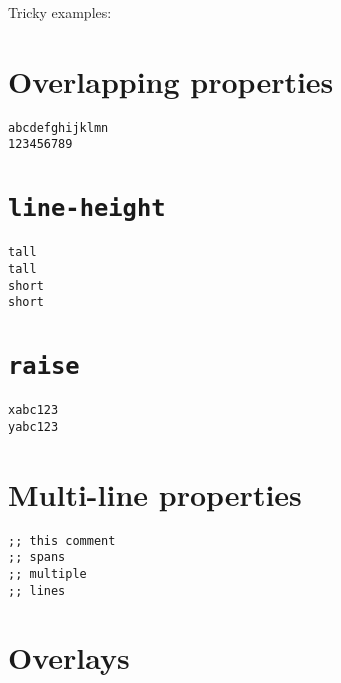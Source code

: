 \documentclass{article}
\begin{document}
Tricky examples:

\section*{Overlapping properties}
\begin{verbatim}
abcdefghijklmn
123456789
\end{verbatim}

\section*{\texttt{line-height}}
\begin{verbatim}
tall
tall
short
short
\end{verbatim}

\section*{\texttt{raise}}
\begin{verbatim}
xabc123
yabc123
\end{verbatim}

\section*{Multi-line properties}
\begin{verbatim}
;; this comment
;; spans
;; multiple
;; lines
\end{verbatim}

\section*{Overlays}
\begin{verbatim}

\end{verbatim}
\end{document}
